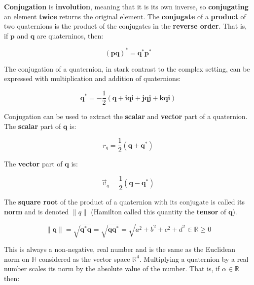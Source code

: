 \textbf{Conjugation} is \textbf{involution}, meaning that it is its own inverse,
so \textbf{conjugating} an element \textbf{twice} returns the original element.
The \textbf{conjugate} of a \textbf{product} of two quaternions is the product of the
conjugates in the \textbf{reverse order}. That is, if $ \mathbf{p} $ and
$ \mathbf{q} $ are quaterninos, then:

\begin{equation}
    ( \mathbf{p} \mathbf{q} )^{*} = \mathbf{q}^{*} \mathbf{p}^{*}
\end{equation}


The conjugation of a quaternion, in stark contrast to the complex setting, can be
expressed with multiplication and addition of quaternions:

\begin{equation}
    \mathbf{q}^{*} = -\frac{1}{2} (\mathbf{q}
    + \mathbf{i} \mathbf{q} \mathbf{i}
    + \mathbf{j} \mathbf{q} \mathbf{j}
    + \mathbf{k} \mathbf{q} \mathbf{i} )
\end{equation}


Conjugation can be used to extract the \textbf{scalar} and \textbf{vector} part of a
quaternion. The \textbf{scalar} part of $ \mathbf{q} $ is:

\begin{equation}
    r_q = \frac{1}{2} ( \mathbf{q} + \mathbf{q}^{*} )
\end{equation}

The \textbf{vector} part of $ \mathbf{q} $ is:

\begin{equation}
    \vec{v}_q = \frac{1}{2} ( \mathbf{q} - \mathbf{q}^{*} )
\end{equation}

The \textbf{square root} of the product of a quaternion with its conjugate is called
its \textbf{norm} and is denoted $ \| q \| $ (Hamilton called this quantity
the \textbf{tensor} of $ \mathbf{q} $).

\begin{equation}
    \| \mathbf{q} \| = \sqrt{ \mathbf{q}^{*} \mathbf{q} }
    = \sqrt{ \mathbf{q} \mathbf{q}^{*} }
    = \sqrt{ a^2 + b^2 + c^2 + d^2 } \in \mathbb{R} \ge 0
\end{equation}

This is always a non-negative, real number and is the same as the Euclidean norm
on $ \mathbb{H} $ considered as the vector space $ \mathbb{R}^4 $. Multiplying
a quaternion by a real number scales its norm by the absolute value of the number.
That is, if $ \alpha \in \mathbb{R} $ then:

